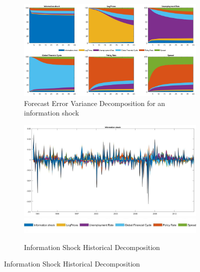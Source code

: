 \documentclass[11pt,a4paper]{article}
\begin{document}
    \begin{figure}[hp]
        \centering

        \begin{subfigure}{\textwidth}
            \centering
            \includegraphics[scale=.32]{Graphs/forecast_err_variance_decomp_3lags.jpg}
            \captionsetup{font=scriptsize}
            \caption{Forecast Error Variance Decomposition for an information shock}
            \label{fig:fevd}
        \end{subfigure}
        
        \vspace{0.2cm} %
        
        \begin{subfigure}{\textwidth}
            \centering
            \includegraphics[scale=.32]{Graphs/INFO_FF4_HD_3lags.jpg}
            \includegraphics*[scale=0.21]{Graphs/Inkedlegend.jpg}
            \captionsetup{font=scriptsize}
            \caption{Information Shock Historical Decomposition}
            \label{fig:INFOhd}
        \end{subfigure}


\end{figure}
\end{document}
